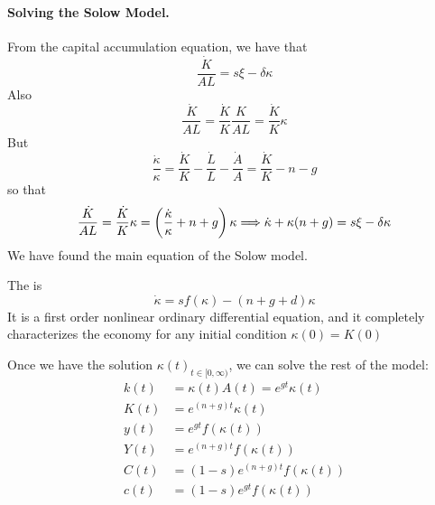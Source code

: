 \documentclass[10pt]{article}
\begin{document}
\paragraph{Solving the Solow Model.} From the capital accumulation equation, we have that
\[
\frac{\dot{K}}{AL} = s\xi - \delta \kappa
\]
Also
\[
\frac{\dot{K}}{AL} = \frac{\dot{K}}{K}\frac{K}{AL} = \frac{\dot{K}}{K} \kappa
\]
But
\[
\frac{\dot{\kappa}}{\kappa} = \frac{\dot{K}}{K} - \frac{\dot{L}}{L} - \frac{\dot{A}}{A} = \frac{\dot{K}}{K} - n - g
\]
so that
\[
\frac{\dot{K}}{AL} =  \frac{\dot{K}}{K} \kappa = \left( \frac{\dot{\kappa}}{\kappa} + n + g\right) \kappa \Longrightarrow \dot{\kappa} + \kappa(n + g) = s\xi - \delta \kappa
\]
We have found the main equation of the Solow model. 

\begin{definition}
	The  is
	\[
	\dot{\kappa} = sf(\kappa) - (n + g + d) \kappa
	\]
	It is a first order nonlinear ordinary differential equation, and it completely characterizes the economy for any initial condition $\kappa(0) = K(0)$
\end{definition}

Once we have the solution $\kappa(t)_{t \in [0,\infty)}$, we can solve the rest of the model:
\begin{align*}
	k(t) &= \kappa(t)A(t) = e^{gt} \kappa(t) \\
	K(t) &= e^{(n+g)t}\kappa(t) \\
	y(t) &= e^{gt} f(\kappa(t)) \\
	Y(t) &= e^{(n+g)t} f(\kappa(t)) \\
	C(t) &= (1-s) e^{(n+g)t} f(\kappa(t)) \\
	c(t) &= (1-s)e^{gt} f(\kappa(t))
\end{align*}
\end{document}
